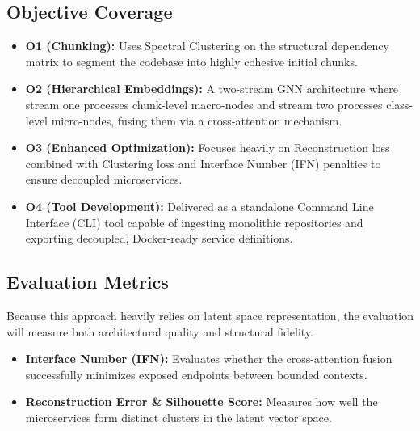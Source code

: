 \documentclass[12pt, a4paper]{article}
\begin{document}
\subsection{Objective Coverage}
\begin{itemize}
    \item \textbf{O1 (Chunking):} Uses Spectral Clustering on the structural dependency matrix to segment the codebase into highly cohesive initial chunks.
    \item \textbf{O2 (Hierarchical Embeddings):} A two-stream GNN architecture where stream one processes chunk-level macro-nodes and stream two processes class-level micro-nodes, fusing them via a cross-attention mechanism.
    \item \textbf{O3 (Enhanced Optimization):} Focuses heavily on Reconstruction loss combined with Clustering loss and Interface Number (IFN) penalties to ensure decoupled microservices.
    \item \textbf{O4 (Tool Development):} Delivered as a standalone Command Line Interface (CLI) tool capable of ingesting monolithic repositories and exporting decoupled, Docker-ready service definitions.
\end{itemize}

\subsection{Evaluation Metrics}
Because this approach heavily relies on latent space representation, the evaluation will measure both architectural quality and structural fidelity.
\begin{itemize}
    \item \textbf{Interface Number (IFN):} Evaluates whether the cross-attention fusion successfully minimizes exposed endpoints between bounded contexts.
    \item \textbf{Reconstruction Error \& Silhouette Score:} Measures how well the microservices form distinct clusters in the latent vector space.
\end{itemize}
\end{document}
